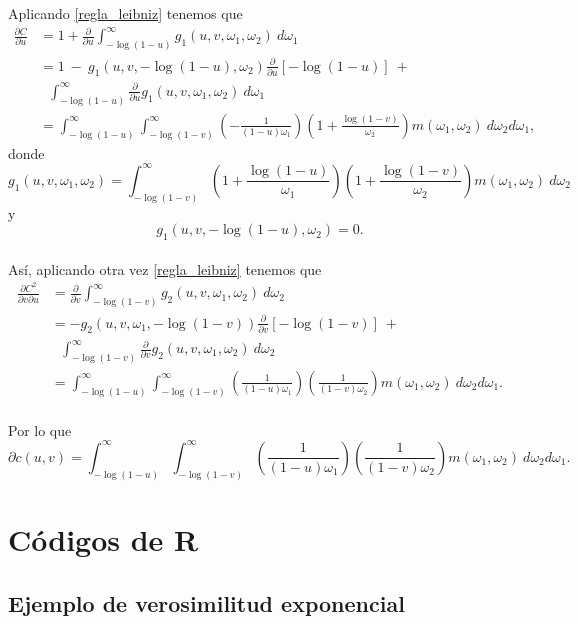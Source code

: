 \documentclass[11pt,a4paper]{article}
\begin{document}
\begin{appendices}
Aplicando \eqref{regla_leibniz} tenemos que
\begin{align*}
\frac{\partial C}{\partial u} &= 1 + \frac{\partial}{\partial u} \int_{-\log (1-u)}^\infty g_1(u, v, \omega_1, \omega_2) \ d\omega_1\\
&= 1 \ - \ g_1(u, v, -\log (1-u), \omega_2)\frac{\partial}{\partial u}\left[ -\log (1-u) \right] \ +\\
& \ \ \ \int_{-\log (1-u)}^{\infty} \frac{\partial}{\partial u}g_1(u, v, \omega_1, \omega_2) \ d\omega_1\\
&= \int_{-\log (1-u)}^\infty \int_{-\log (1-v)}^\infty \left(-\frac{1}{(1-u)\omega_1}\right)\left(1+\frac{\log (1-v)}{\omega_2}\right) m(\omega_1, \omega_2) \ d\omega_2 d\omega_1,
\end{align*}
donde $$g_1(u, v, \omega_1, \omega_2) = \int_{-\log (1-v)}^\infty \left(1+\frac{\log (1-u)}{\omega_1}\right)\left(1+\frac{\log (1-v)}{\omega_2}\right) m(\omega_1, \omega_2) \ d\omega_2$$ y $$g_1(u, v, -\log (1-u), \omega_2) = 0.$$\\

Así, aplicando otra vez \eqref{regla_leibniz} tenemos que
\begin{align*}
\frac{\partial C^2}{\partial v \partial u} &= \frac{\partial}{\partial v} \int_{-\log (1-v)}^\infty g_2(u, v, \omega_1, \omega_2) \ d\omega_2\\
&= -g_2(u, v, \omega_1, -\log (1-v))\frac{\partial}{\partial v}\left[ -\log (1-v)\right] \ +\\
&\ \ \ \int_{-\log (1-v)}^\infty \frac{\partial}{\partial v}g_2(u, v, \omega_1, \omega_2) \ d\omega_2\\
&= \int_{-\log (1-u)}^\infty \int_{- \log (1-v)}^\infty \left(\frac{1}{(1-u)\omega_1}\right)\left(\frac{1}{(1-v)\omega_2}\right) m(\omega_1, \omega_2) \ d\omega_2 d\omega_1.\\
\end{align*}

Por lo que $$\partial c(u, v) = \int_{-\log (1-u)}^\infty \int_{- \log (1-v)}^\infty \left(\frac{1}{(1-u)\omega_1}\right)\left(\frac{1}{(1-v)\omega_2}\right) m(\omega_1, \omega_2) \ d\omega_2 d\omega_1.$$

\newpage

\section{Códigos de R}
\subsection{Ejemplo de verosimilitud exponencial}
\label{ap:lik}


\end{appendices}
\end{document}
